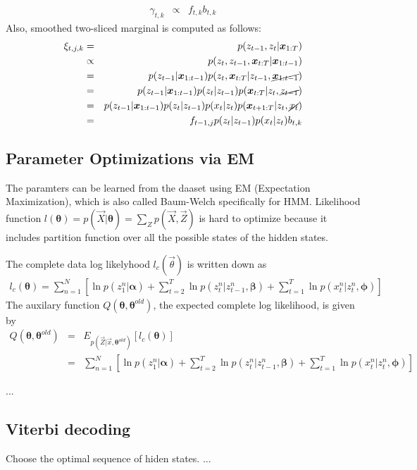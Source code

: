 \begin{eqnarray}
  \gamma_{t,k} &\propto& f_{t,k} b_{t,k}
\end{eqnarray}
Also, smoothed two-sliced marginal is computed as follows:
\begin{eqnarray}
  \xi_{t,j,k} 
  &=&  p(z_{t-1},z_t| \vec{x}_{1:T}) \nonumber \\
  &\propto& p(z_t, z_{t-1}, \vec{x}_{t:T}|\vec{x}_{1:t-1}) \nonumber \\
  &=& p(z_{t-1}|\mathbf{x}_{1:t-1})p(z_t, \mathbf{x}_{t:T}|z_{t-1}, \cancel{\mathbf{x}_{1:t-1}}) \nonumber \\
  &=& p(z_{t-1}|\mathbf{x}_{1:t-1})p(z_t|z_{t-1})p(\mathbf{x}_{t:T}|z_t, \cancel{z_{t-1}}) \nonumber \\
  &=& p(z_{t-1}|\mathbf{x}_{1:t-1})p(z_t|z_{t-1})p(x_t|z_t)p(\mathbf{x}_{t+1:T}|z_t, \cancel{x_t}) \nonumber \\
  &=& f_{t-1,j}p(z_t|z_{t-1})p(x_t|z_t)b_{t,k}
\end{eqnarray}
\subsection{Parameter Optimizations via EM}
The paramters can be learned from the daaset using EM (Expectation Maximization), which is also called Baum-Welch specifically for HMM. Likelihood function $l(\mathbf{\theta}) = p(\vec{X} | \mathbf{\theta}) = \sum_Z p(\vec{X}, \vec{Z})$ is hard to optimize because it includes partition function over all the possible states of the hidden states.

The complete data log likelyhood $l_c(\vec{\theta})$ is written down as 
\begin{eqnarray}
l_c(\mathbf{\theta}) = \sum_{n=1}^N \left[ \ln p(z^n_1| \mathbf{\alpha}) 
+ \sum_{t=2}^T\ln p(z^n_t| z^n_{t-1}, \mathbf{\beta})
+ \sum_{t=1}^T\ln p(x^n_t | z^n_{t}, \mathbf{\phi})
\right]
\end{eqnarray}
The auxilary function $Q(\mathbf{\theta}, \mathbf{\theta}^{old})$, the expected complete log likelihood, is given by
\begin{eqnarray}
Q(\mathbf{\theta}, \mathbf{\theta}^{old}) &=& E_{p(\vec{Z}|\vec{x}, \mathbf{\theta}^{old})}[l_c(\mathbf{\theta})] \nonumber \\
&=& \sum_{n=1}^N \left[ \ln p(z^n_1| \mathbf{\alpha}) 
+ \sum_{t=2}^T\ln p(z^n_t| z^n_{t-1}, \mathbf{\beta})
+ \sum_{t=1}^T\ln p(x^n_t | z^n_{t}, \mathbf{\phi})
\right]
\end{eqnarray}


...

\subsection{Viterbi decoding}
Choose the optimal sequence of hiden states.
...


